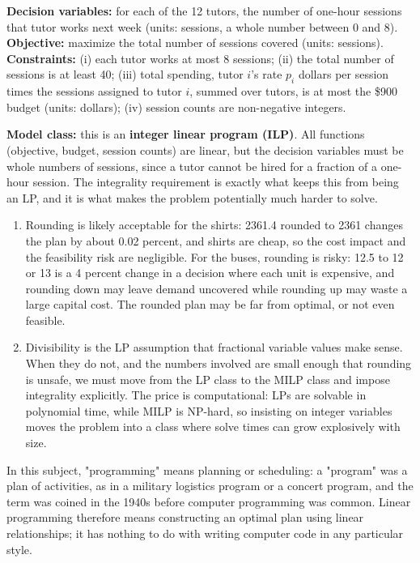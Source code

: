 
\textbf{Decision variables:} for each of the 12 tutors, the number of one-hour sessions that tutor works next week (units: sessions, a whole number between 0 and 8).
\textbf{Objective:} maximize the total number of sessions covered (units: sessions).
\textbf{Constraints:} (i) each tutor works at most 8 sessions; (ii) the total number of sessions is at least 40; (iii) total spending, tutor $i$'s rate $p_i$ dollars per session times the sessions assigned to tutor $i$, summed over tutors, is at most the \$900 budget (units: dollars); (iv) session counts are non-negative integers.

\textbf{Model class:} this is an \textbf{integer linear program (ILP)}. All functions (objective, budget, session counts) are linear, but the decision variables must be whole numbers of sessions, since a tutor cannot be hired for a fraction of a one-hour session. The integrality requirement is exactly what keeps this from being an LP, and it is what makes the problem potentially much harder to solve.


\begin{enumerate}
\item Rounding is likely acceptable for the shirts: 2361.4 rounded to 2361 changes the plan by about 0.02 percent, and shirts are cheap, so the cost impact and the feasibility risk are negligible. For the buses, rounding is risky: 12.5 to 12 or 13 is a 4 percent change in a decision where each unit is expensive, and rounding down may leave demand uncovered while rounding up may waste a large capital cost. The rounded plan may be far from optimal, or not even feasible.
\item Divisibility is the LP assumption that fractional variable values make sense. When they do not, and the numbers involved are small enough that rounding is unsafe, we must move from the LP class to the MILP class and impose integrality explicitly. The price is computational: LPs are solvable in polynomial time, while MILP is NP-hard, so insisting on integer variables moves the problem into a class where solve times can grow explosively with size.
\end{enumerate}


In this subject, "programming" means planning or scheduling: a "program" was a plan of activities, as in a military logistics program or a concert program, and the term was coined in the 1940s before computer programming was common. Linear programming therefore means constructing an optimal plan using linear relationships; it has nothing to do with writing computer code in any particular style.

